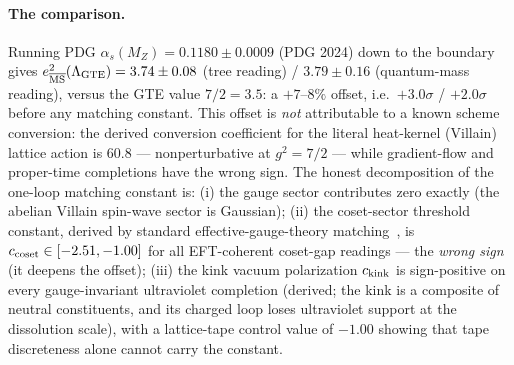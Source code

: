 \documentclass[11pt]{article}
\theoremstyle{remark}
\begin{document}
\paragraph{The comparison.}
Running PDG $\alpha_s(M_Z) = 0.1180 \pm 0.0009$ (PDG 2024) down to the
boundary gives $e^2_{\overline{\rm MS}}(\Lambda_{\rm GTE}) = 3.74 \pm 0.08$
(tree reading) / $3.79 \pm 0.16$ (quantum-mass reading), versus the GTE value
$7/2 = 3.5$: a $+7$--$8\%$ offset, i.e.\ $+3.0\sigma$ / $+2.0\sigma$ before
any matching constant.  This offset is \emph{not} attributable to a known
scheme conversion: the derived conversion coefficient for the literal
heat-kernel (Villain) lattice action is $60.8$ --- nonperturbative at
$g^2 = 7/2$ --- while gradient-flow and proper-time completions have the
wrong sign.  The honest decomposition of the one-loop matching constant is:
(i) the gauge sector contributes zero exactly (the abelian Villain spin-wave
sector is Gaussian); (ii) the coset-sector threshold constant, derived by
standard effective-gauge-theory matching~\cite{Weinberg1980EffectiveGauge,
Hall1981GrandUnification}, is $c_{\rm coset} \in [-2.51, -1.00]$ for all
EFT-coherent coset-gap readings --- the \emph{wrong sign} (it deepens the
offset); (iii) the kink vacuum polarization $c_{\rm kink}$ is sign-positive
on every gauge-invariant ultraviolet completion (derived; the kink is a
composite of neutral constituents, and its charged loop loses ultraviolet
support at the dissolution scale), with a lattice-tape control value of
$-1.00$ showing that tape discreteness alone cannot carry the constant.
\end{document}
